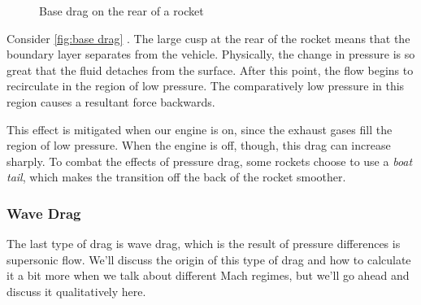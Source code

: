 \documentclass[10pt, openany, titlepage]{book}
\theoremstyle{definition}
\let\oldautoref\autoref
\renewcommand{\autoref}[1]{%
  \begingroup
  \hypersetup{linkcolor=black}%
  \oldautoref{#1}%
  \endgroup
}
\begin{document}
\begin{figure}[ht]

    
    \caption{Base drag on the rear of a rocket}
    \label{fig:base drag}
\end{figure}

Consider \autoref{fig:base drag}. The large cusp at the rear of the rocket means that the boundary layer separates from the vehicle. Physically, the change in pressure is so great that the fluid detaches from the surface. After this point, the flow begins to recirculate in the region of low pressure. The comparatively low pressure in this region causes a resultant force backwards.

This effect is mitigated when our engine is on, since the exhaust gases fill the region of low pressure. When the engine is off, though, this drag can increase sharply. To combat the effects of pressure drag, some rockets choose to use a \textit{boat tail}, which makes the transition off the back of the rocket smoother.

\subsubsection{Wave Drag}
The last type of drag is \gls{wave drag}, which is the result of pressure differences is supersonic flow. We'll discuss the origin of this type of drag and how to calculate it a bit more when we talk about different Mach regimes, but we'll go ahead and discuss it qualitatively here.
\end{document}
